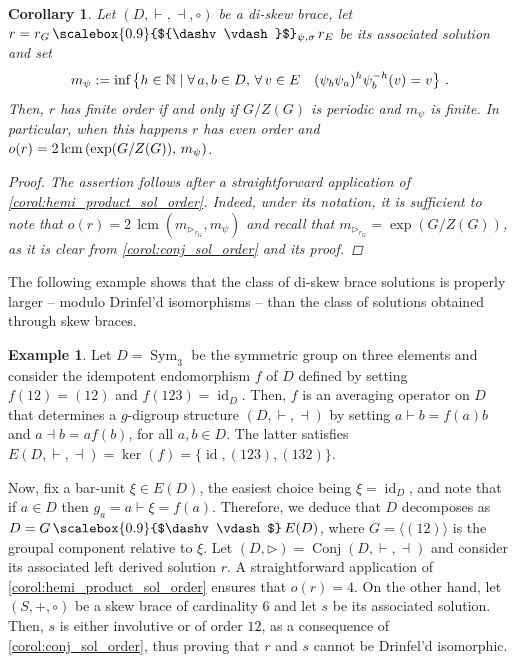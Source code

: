 \documentclass[preprint,1p]{elsarticle}
\numberwithin{equation}{section}
\newtheorem{cor}[theor]{Corollary}
\theoremstyle{definition}               %
\newtheorem{ex}[theor]{Example}
\newcommand{\vd}{\vdash}
\newcommand{\dv}{\dashv}
\newcommand{\tr}{\triangleright}
\DeclareMathOperator{\Sym}{Sym}
\DeclareMathOperator{\Conj}{Conj}
\DeclareMathOperator{\id}{id}
\DeclareMathOperator{\lcm}{lcm}
\begin{document}
\smallskip

\begin{cor}\label{corol:diskew_sol_order}
    Let $(D,\vd,\dv,\circ)$ be a di-skew brace, let $r = r_G\, \text{\scalebox{0.9}{${\dv\vd}$}$_{\psi,\sigma}$}\, r_E$ be its associated solution and set
    \begin{align*}
        m_\psi := \textnormal{inf}\left\{h \in \mathbb{N}\mid \forall\, a,b \in D,\, \forall\, v \in E \quad (\psi_b\psi_a)^h\psi_b^{-h}(v) = v\right\} \,.
    \end{align*}
    Then, $r$ has finite order if and only if $G/Z(G)$ is periodic and $m_\psi$ is finite.
    In particular, when this happens $r$ has even order and $o(r) = 2\,\textnormal{lcm}\left(\exp(G/Z(G)),\,m_\psi\right)$.
    \begin{proof}
        The assertion follows after a straightforward application of \cref{corol:hemi_product_sol_order}.
        Indeed, under its notation, it is sufficient to note that $o(r) = 2\,\lcm(m_{\tr_{r_G}}, m_\psi)$ and recall that $m_{\tr_{r_G}} = \exp(G/Z(G))$, as it is clear from \cref{corol:conj_sol_order} and its proof.
    \end{proof}
\end{cor}

The following example shows that the class of di-skew brace solutions is properly larger -- modulo Drinfel'd isomorphisms -- than the class of solutions obtained through skew braces.

\begin{ex}
    Let $D = \Sym_3$ be the symmetric group on three elements and consider the idempotent endomorphism $f$ of $D$ defined by setting ${f(12) = (12)}$ and $f(123) = \id_D$.
    Then, $f$ is an averaging operator on $D$ that determines a $g$-digroup structure $(D,\vd,\dv)$ by setting $a \vd b = f(a) b$ and $a \dv b = a f(b)$, for all $a,b \in D$.
    The latter satisfies $E(D,\vd,\dv) = \ker(f) = \{\id, (123), (132)\}$.
    
    Now, fix a bar-unit $\xi \in E(D)$, the easiest choice being $\xi = \id_D$, and note that if $a \in D$ then $g_a = a \vd \xi = f(a)$.
    Therefore, we deduce that $D$ decomposes as $D = G \,\text{\scalebox{0.9}{$\dv\vd$}}\, E(D)$, where $G = \langle (12) \rangle$ is the groupal component relative to $\xi$.
    Let $(D,\tr) = \Conj(D,\vd,\dv)$ and consider its associated left derived solution $r$.
    A straightforward application of \cref{corol:hemi_product_sol_order} ensures that $o(r) = 4$.
    On the other hand, let $(S,+,\circ)$ be a skew brace of cardinality $6$ and let $s$ be its associated solution.
    Then, $s$ is either involutive or of order $12$, as a consequence of \cref{corol:conj_sol_order}, thus proving that $r$ and $s$ cannot be Drinfel'd isomorphic.
\end{ex}
\end{document}
